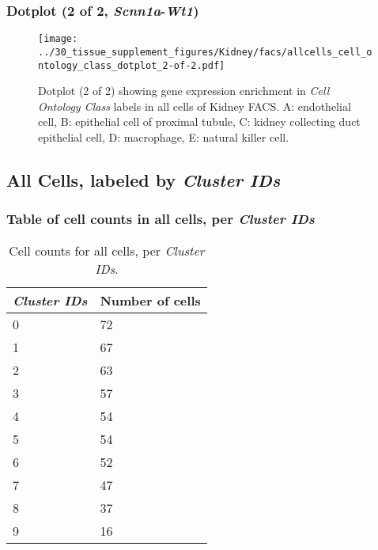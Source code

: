 \clearpage

\subsubsection{Dotplot (2 of 2, \emph{Scnn1a}-\emph{Wt1})}
\begin{figure}[h]
\centering
\texttt{[image: ../30\_tissue\_supplement\_figures/Kidney/facs/allcells\_cell\_ontology\_class\_dotplot\_2-of-2.pdf]}

\caption{ Dotplot (2 of 2)  showing gene expression enrichment in \emph{Cell Ontology Class} labels in all cells of Kidney FACS. A: endothelial cell, B: epithelial cell of proximal tubule, C: kidney collecting duct epithelial cell, D: macrophage, E: natural killer cell.}
\end{figure}


\clearpage

\subsection{All Cells, labeled by \emph{Cluster IDs}}
\subsubsection{Table of cell counts in all cells, per \emph{Cluster IDs}}\begin{table}[h]
\centering
\label{my-label}
\begin{tabular}{@{}ll@{}}
\toprule

\emph{Cluster IDs}& Number of cells \\ \midrule
0 & 72 \\

1 & 67 \\

2 & 63 \\

3 & 57 \\

4 & 54 \\

5 & 54 \\

6 & 52 \\

7 & 47 \\

8 & 37 \\

9 & 16 \\
\bottomrule
\end{tabular}
\caption{Cell counts for all cells, per \emph{Cluster IDs}.}
\end{table}

